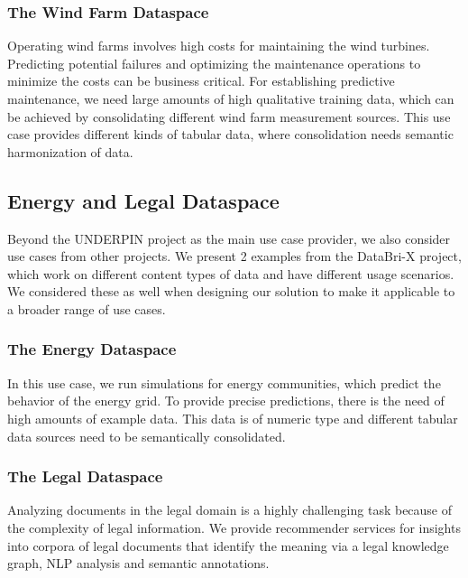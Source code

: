 \documentclass[manuscript,screen]{acmart}
\begin{document}
\subsubsection{The Wind Farm Dataspace}\label{the-wind-farm-dataspace}

Operating wind farms involves high costs for maintaining the wind
turbines. Predicting potential failures and optimizing the maintenance
operations to minimize the costs can be business critical. For
establishing predictive maintenance, we need large amounts of high
qualitative training data, which can be achieved by consolidating
different wind farm measurement sources. This use case provides
different kinds of tabular data, where consolidation needs semantic
harmonization of data.

\subsection{Energy and Legal
Dataspace}\label{energy-and-legal-dataspace}

Beyond the UNDERPIN project as the main use case provider, we also
consider use cases from other projects. We present 2 examples from the
DataBri-X project, which work on different content types of data and
have different usage scenarios. We considered these as well when
designing our solution to make it applicable to a broader range of use
cases.

\subsubsection{The Energy Dataspace}\label{the-energy-dataspace}

In this use case, we run simulations for energy communities, which
predict the behavior of the energy grid. To provide precise predictions,
there is the need of high amounts of example data. This data is of
numeric type and different tabular data sources need to be semantically
consolidated.

\subsubsection{The Legal Dataspace}\label{the-legal-dataspace}

Analyzing documents in the legal domain is a highly challenging task
because of the complexity of legal information. We provide recommender
services for insights into corpora of legal documents that identify the
meaning via a legal knowledge graph, NLP analysis and semantic
annotations.
\end{document}
